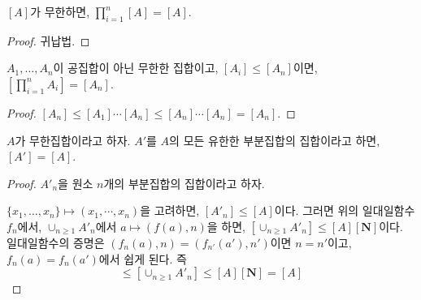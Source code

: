 \begin{corollary}
	$[A]$가 무한하면, $\prod_{i = 1}^{n} [A] = [A]$.
\end{corollary}
\begin{proof}
	귀납법.
\end{proof}
\begin{corollary}
	$A_1, \dots, A_n$이 공집합이 아닌 무한한 집합이고, $[A_i] \leq [A_n]$이면, $[\prod_{i = 1}^{n} A_i] = [A_n]$.
\end{corollary}
\begin{proof}
	$[A_n] \leq [A_1]\cdots[A_n] \leq [A_n]\cdots[A_n] = [A_n]$.
\end{proof}
\begin{corollary}
	$A$가 무한집합이라고 하자.
	$A'$를 $A$의 모든 유한한 부분집합의 집합이라고 하면, $[A'] = [A]$.
\end{corollary}
\begin{proof}
	$A'_n$을 원소 $n$개의 부분집합의 집합이라고 하자.

	$\{x_1, \dots, x_n\} \mapsto (x_1, \dotsb, x_n)$을 고려하면, $[A'_n] \leq [A]$이다.
	그러면 위의 일대일함수 $f_n$에서, $\cup_{n \geq 1} A'_n$에서 $a \mapsto (f(a), n)$을 하면,
	$[\cup_{n \geq 1} A'_n] \leq [A][\mathbf{N}]$이다.
	일대일함수의 증명은 $(f_n(a), n) = (f_{n'}(a'), n')$이면 $n = n'$이고, $f_n(a) = f_n(a')$에서 쉽게 된다.
	즉
	\begin{equation}
		[A] \leq [\cup_{n \geq 1} A'_n] \leq [A][\mathbf{N}] = [A]
	\end{equation}
\end{proof}

